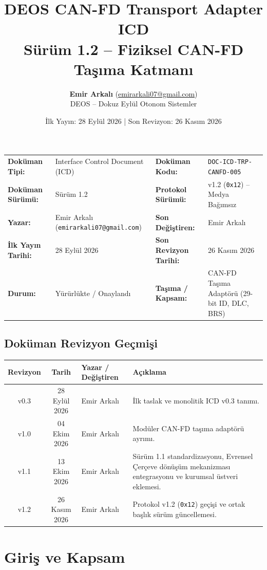 \documentclass[a4paper,10pt]{article}
\title{\textbf{DEOS CAN-FD Transport Adapter ICD}\\
\large Sürüm 1.2 -- Fiziksel CAN-FD Taşıma Katmanı}
\author{\textbf{Emir Arkalı} (\href{mailto:emirarkali07@gmail.com}{emirarkali07@gmail.com})\\DEOS -- Dokuz Eylül Otonom Sistemler}
\date{İlk Yayın: 28 Eylül 2026 \quad | \quad Son Revizyon: 26 Kasım 2026}
\newcommand{\hex}[1]{\texttt{0x#1}}
\newcommand{\code}[1]{\texttt{#1}}
\begin{document}
\maketitle

\begin{center}
\small
\begin{tabularx}{\textwidth}{ll lX}
\toprule
\textbf{Doküman Tipi:} & Interface Control Document (ICD) & \textbf{Doküman Kodu:} & \code{DOC-ICD-TRP-CANFD-005} \\
\textbf{Doküman Sürümü:} & Sürüm 1.2 & \textbf{Protokol Sürümü:} & v1.2 (\hex{12}) -- Medya Bağımsız \\
\textbf{Yazar:} & Emir Arkalı (\texttt{emirarkali07@gmail.com}) & \textbf{Son Değiştiren:} & Emir Arkalı \\
\textbf{İlk Yayın Tarihi:} & 28 Eylül 2026 & \textbf{Son Revizyon Tarihi:} & 26 Kasım 2026 \\
\textbf{Durum:} & Yürürlükte / Onaylandı & \textbf{Taşıma / Kapsam:} & CAN-FD Taşıma Adaptörü (29-bit ID, DLC, BRS) \\
\bottomrule
\end{tabularx}
\end{center}

\subsection*{Doküman Revizyon Geçmişi}
\begin{center}
\small
\begin{tabularx}{\textwidth}{c c l X}
\toprule
\textbf{Revizyon} & \textbf{Tarih} & \textbf{Yazar / Değiştiren} & \textbf{Açıklama} \\
\midrule
v0.3 & 28 Eylül 2026 & Emir Arkalı & İlk taslak ve monolitik ICD v0.3 tanımı. \\
v1.0 & 04 Ekim 2026 & Emir Arkalı & Modüler CAN-FD taşıma adaptörü ayrımı. \\
v1.1 & 13 Ekim 2026 & Emir Arkalı & Sürüm 1.1 standardizasyonu, Evrensel Çerçeve dönüşüm mekanizması entegrasyonu ve kurumsal üstveri eklemesi. \\
v1.2 & 26 Kasım 2026 & Emir Arkalı & Protokol v1.2 (\hex{12}) geçişi ve ortak başlık sürüm güncellemesi. \\
\bottomrule
\end{tabularx}
\end{center}
\vspace{0.8em}

\section{Giriş ve Kapsam}
\end{document}
